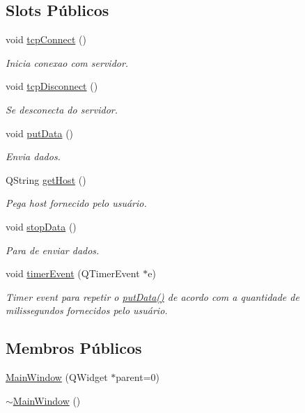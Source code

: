 \subsection*{Slots Públicos}
\begin{DoxyCompactItemize}
\item 
void \mbox{\hyperlink{class_main_window_ac5b669957c442b6eb68573dacfce33e1}{tcp\+Connect}} ()
\begin{DoxyCompactList}\small\item\em Inicia conexao com servidor. \end{DoxyCompactList}\item 
void \mbox{\hyperlink{class_main_window_a4d22c4c7afc7ba0a2fa4c70515c85dda}{tcp\+Disconnect}} ()
\begin{DoxyCompactList}\small\item\em Se desconecta do servidor. \end{DoxyCompactList}\item 
void \mbox{\hyperlink{class_main_window_afdfeb13ec363b0eb8ecacaf0aa13b605}{put\+Data}} ()
\begin{DoxyCompactList}\small\item\em Envia dados. \end{DoxyCompactList}\item 
Q\+String \mbox{\hyperlink{class_main_window_a57a1f8959ed5f0eee73281829b2331fa}{get\+Host}} ()
\begin{DoxyCompactList}\small\item\em Pega host fornecido pelo usuário. \end{DoxyCompactList}\item 
void \mbox{\hyperlink{class_main_window_a79fdaf1fd769f0584f50da34e415b3de}{stop\+Data}} ()
\begin{DoxyCompactList}\small\item\em Para de enviar dados. \end{DoxyCompactList}\item 
void \mbox{\hyperlink{class_main_window_a9d08a694a5f9c532225754381b8011ea}{timer\+Event}} (Q\+Timer\+Event $\ast$e)
\begin{DoxyCompactList}\small\item\em Timer event para repetir o \mbox{\hyperlink{class_main_window_afdfeb13ec363b0eb8ecacaf0aa13b605}{put\+Data()}} de acordo com a quantidade de milissegundos fornecidos pelo usuário. \end{DoxyCompactList}\end{DoxyCompactItemize}
\subsection*{Membros Públicos}
\begin{DoxyCompactItemize}
\item 
\mbox{\hyperlink{class_main_window_a8b244be8b7b7db1b08de2a2acb9409db}{Main\+Window}} (Q\+Widget $\ast$parent=0)
\item 
\mbox{\hyperlink{class_main_window_ae98d00a93bc118200eeef9f9bba1dba7}{$\sim$\+Main\+Window}} ()
\end{DoxyCompactItemize}


